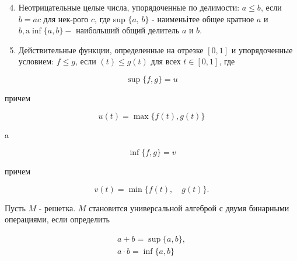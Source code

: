 \documentclass[10pt]{article}
\begin{document}
\begin{enumerate}

  \setcounter{enumi}{3}

  \item Неотрицательные целые числа, упорядоченные по делимости: $a \leqslant b$, если $b=a c$ для нек-рого $c$, где sup $\{a$, $b\}$ - наименьітее общее кратное $a$ и $b, \mathrm{a} \inf \{a, b\}-$ наибольший общий делитель $a$ и $b$.



  \item Действительные функции, определенные на отрезке $[0,1]$ и упорядоченные условием: $f \leqslant g$, если $(t) \leqslant g(t)$ для всех $t \in[0,1]$, где



\end{enumerate}



\[

\sup \{f, g\}=u

\]



причем



\[

u(t)=\max \{f(t), g(t)\}

\]



a



\[

\inf \{f, g\}=v

\]



причем



\[

v(t)=\min \{f(t), \quad g(t)\} .

\]



Пусть $M$ - решетка. $M$ становится универсальной алгеброй с двумя бинарными операциями, если определить



\[

\begin{gathered}

a+b=\sup \{a, b\}, \\

a \cdot b=\inf \{a, b\}

\end{gathered}

\]
\end{document}
